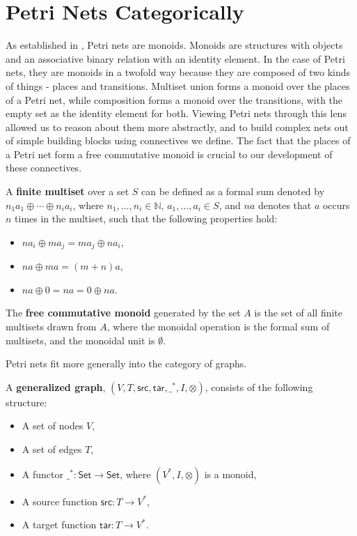 \section{Petri Nets Categorically}
As established in \cite{MESEGUER1990105}, Petri nets are monoids. Monoids are structures with objects and an associative binary relation with an identity element. In the case of Petri nets, they are monoids in a twofold way because they are composed of two kinds of things - places and transitions. Multiset union forms a monoid over the places of a Petri net, while composition forms a monoid over the transitions, with the empty set as the identity element for both. Viewing Petri nets through this lens allowed us to reason about them more abstractly, and to build complex nets out of simple building blocks using connectives we define. 
The fact that the places of a Petri net form a free commutative monoid is crucial to our development of these connectives. 
\begin{definition}
  \label{def:Finite-Multiset}
  A \textbf{finite multiset} over a set $S$ can be defined as a formal
  sum denoted by $n_1a_1 \oplus \cdots \oplus n_ia_i$, where $n_1,
  \ldots, n_i \in \mathbb{N}$, $a_1, \ldots, a_i \in S$, and $na$
  denotes that $a$ occurs $n$ times in the multiset, such that the
  following properties hold:
  \begin{itemize}    
  \item $na_i \oplus ma_j = ma_j \oplus na_i$,
  \item $na \oplus ma = (m+n)a$,
  \item $na \oplus 0 = na = 0 \oplus na$.
  \end{itemize}
\end{definition}
%
\begin{definition}
  \label{def:Free-Commutative-Monoid}  
  The \textbf{free commutative monoid} generated by the set $A$ is the
  set of all finite multisets drawn from $A$, where the monoidal
  operation is the formal sum of multisets, and the monoidal unit is
  $\emptyset$.
\end{definition}
%
Petri nets fit more generally into the category of graphs.
\begin{definition}
  \label{def:Graph}
  A \textbf{generalized graph}, $(V, T, \mathsf{src}, \mathsf{tar}, \_^*,I,\otimes)$, consists of the following structure:
  \begin{itemize}
  \item A set of nodes $V$,
  \item A set of edges $T$,
  \item A functor $\_^* : \mathsf{Set} \to \mathsf{Set}$, where
    $(V^*,I,\otimes)$ is a monoid,
  \item A source function $\mathsf{src} : T \to V^*$,
  \item A target function $\mathsf{tar} : T \to V^*$.
  \end{itemize}
\end{definition}
